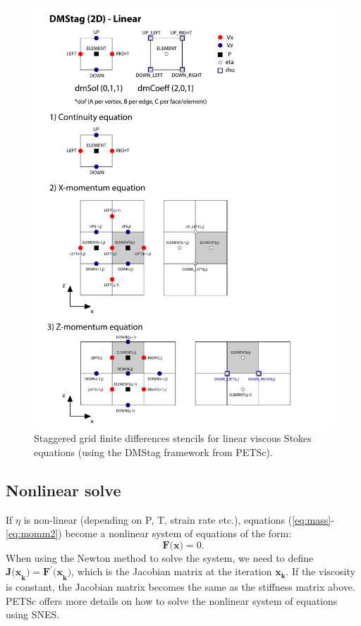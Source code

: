 \documentclass[a4paper,11pt]{article}
\begin{document}
\begin{figure}
\begin{center}
\noindent \includegraphics[trim=0mm 0mm 0mm 0mm, clip, width=\textwidth]{stencils-Stokes_ksp.pdf} 
\caption{Staggered grid finite differences stencils for linear viscous Stokes equations (using the DMStag framework from PETSc).}
\label{fig:stokes_ksp}
  \end{center}
\end{figure}

\subsection{Nonlinear solve}
If $\eta$ is non-linear (depending on P, T, strain rate etc.), equations (\ref{eq:mass}-\ref{eq:momm2}) become a nonlinear system of equations of the form:
\begin{equation}
\textbf{F(x)} = 0.
\end{equation}
When using the Newton method to solve the system, we need to define $\textbf{J(x}_\textbf{k}) = \textbf{F}^\prime\textbf{(x}_\textbf{k})$, which is the Jacobian matrix at the iteration $\textbf{x}_\textbf{k}$. If the viscosity is constant, the Jacobian matrix becomes the same as the stiffness matrix above. PETSc offers more details on how to solve the nonlinear system of equations using SNES.
\end{document}
